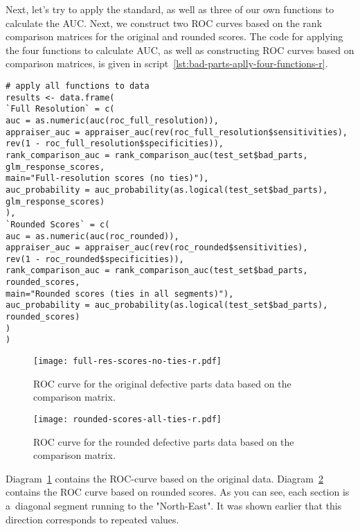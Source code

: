 \documentclass[]{scrreprt}
\begin{document}
Next, let's try to apply the standard, as well as three of our own functions to calculate the AUC. Next, we construct two ROC curves based on the rank comparison matrices for the original and rounded scores. The code for applying the four functions to calculate AUC, as well as constructing ROC curves based on comparison matrices, is given in script~\ref{lst:bad-parts-aplly-four-functions-r}.
%
\begin{lstlisting}[float=htp, caption = Using four functions to calculate AUC and plot ROC curves based on comparison matrices for original and rounded scores, firstnumber=1, label= lst:bad-parts-aplly-four-functions-r]
# apply all functions to data
results <- data.frame(
`Full Resolution` = c(
auc = as.numeric(auc(roc_full_resolution)),
appraiser_auc = appraiser_auc(rev(roc_full_resolution$sensitivities),
rev(1 - roc_full_resolution$specificities)),
rank_comparison_auc = rank_comparison_auc(test_set$bad_parts,
glm_response_scores, 
main="Full-resolution scores (no ties)"),
auc_probability = auc_probability(as.logical(test_set$bad_parts),
glm_response_scores)
),
`Rounded Scores` = c( 
auc = as.numeric(auc(roc_rounded)),
appraiser_auc = appraiser_auc(rev(roc_rounded$sensitivities),
rev(1 - roc_rounded$specificities)),
rank_comparison_auc = rank_comparison_auc(test_set$bad_parts, rounded_scores,
main="Rounded scores (ties in all segments)"),
auc_probability = auc_probability(as.logical(test_set$bad_parts),
rounded_scores)
)
)
\end{lstlisting}
%
\begin{figure}[htp]
	\centering
	\texttt{[image: full-res-scores-no-ties-r.pdf]}
	\caption{ROC curve for the original defective parts data based on the comparison matrix.}
	\label{fig:bad-parts-ROC-original-r}
\end{figure}
%
\begin{figure}[htp]
	\centering
	\texttt{[image: rounded-scores-all-ties-r.pdf]}
	\caption{ROC curve for the rounded defective parts data based on the comparison matrix.}
	\label{fig:bad-parts-ROC-rounded-r}
\end{figure}
%

Diagram~\ref{fig:bad-parts-ROC-original-r} contains the ROC-curve based on the original data. Diagram~\ref{fig:bad-parts-ROC-rounded-r} contains the ROC curve based on rounded scores. As you can see, each section is a~diagonal segment running to the "North-East". It was shown earlier that this direction corresponds to repeated values.
\end{document}
